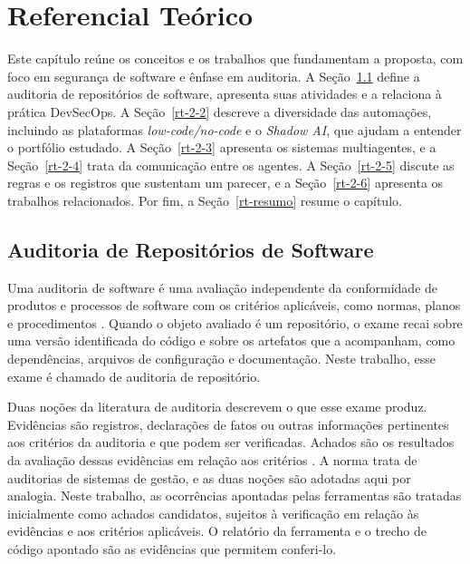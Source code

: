 
\chapter{Referencial Teórico}
\label{cap-referencial-teorico}

Este capítulo reúne os conceitos e os trabalhos que fundamentam a proposta, com foco em segurança de software e ênfase em auditoria. A Seção~\ref{rt-2-1} define a auditoria de repositórios de software, apresenta suas atividades e a relaciona à prática DevSecOps. A Seção~\ref{rt-2-2} descreve a diversidade das automações, incluindo as plataformas \textit{low-code/no-code} e o \textit{Shadow AI}, que ajudam a entender o portfólio estudado. A Seção~\ref{rt-2-3} apresenta os sistemas multiagentes, e a Seção~\ref{rt-2-4} trata da comunicação entre os agentes. A Seção~\ref{rt-2-5} discute as regras e os registros que sustentam um parecer, e a Seção~\ref{rt-2-6} apresenta os trabalhos relacionados. Por fim, a Seção~\ref{rt-resumo} resume o capítulo.

\section{Auditoria de Repositórios de Software}
\label{rt-2-1}

Uma auditoria de software é uma avaliação independente da conformidade de produtos e processos de software com os critérios aplicáveis, como normas, planos e procedimentos \cite{ieee1028}. Quando o objeto avaliado é um repositório, o exame recai sobre uma versão identificada do código e sobre os artefatos que a acompanham, como dependências, arquivos de configuração e documentação. Neste trabalho, esse exame é chamado de auditoria de repositório.

Duas noções da literatura de auditoria descrevem o que esse exame produz. Evidências são registros, declarações de fatos ou outras informações pertinentes aos critérios da auditoria e que podem ser verificadas. Achados são os resultados da avaliação dessas evidências em relação aos critérios \cite{iso19011}. A norma trata de auditorias de sistemas de gestão, e as duas noções são adotadas aqui por analogia. Neste trabalho, as ocorrências apontadas pelas ferramentas são tratadas inicialmente como achados candidatos, sujeitos à verificação em relação às evidências e aos critérios aplicáveis. O relatório da ferramenta e o trecho de código apontado são as evidências que permitem conferi-lo.

